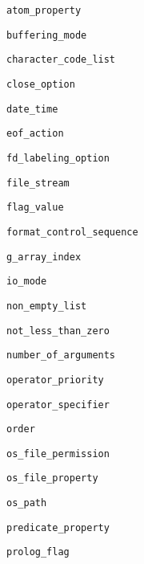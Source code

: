 \begin{ItemizeThreeCols}

\item \texttt{atom\_property}

\item \texttt{buffering\_mode}

\item \texttt{character\_code\_list}

\item \texttt{close\_option}

\item \texttt{date\_time}

\item \texttt{eof\_action}

\item \texttt{fd\_labeling\_option}

\item \texttt{file\_stream}

\item \texttt{flag\_value}

\item \texttt{format\_control\_sequence}

\item \texttt{g\_array\_index}

\item \texttt{io\_mode}

\item \texttt{non\_empty\_list}

\item \texttt{not\_less\_than\_zero}

\item \texttt{number\_of\_arguments}

\item \texttt{operator\_priority}

\item \texttt{operator\_specifier}

\item \texttt{order}

\item \texttt{os\_file\_permission}

\item \texttt{os\_file\_property}

\item \texttt{os\_path}

\item \texttt{predicate\_property}

\item \texttt{prolog\_flag}


\end{ItemizeThreeCols}
